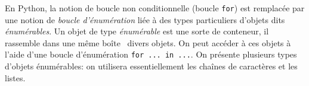 
    
En Python, la notion de boucle non conditionnelle (boucle \texttt{for}) est remplacée par une notion de \emph{boucle d'énumération} liée à des types particuliers d'objets dits \emph{énumérables}.\newline
Un objet de type \emph{énumérable} est une sorte de conteneur, il rassemble \og dans une même boîte\fg~ divers objets. On peut accéder à ces objets à l'aide d'une boucle d'énumération \texttt{for ... in ...}.\newline
On présente plusieurs types d'objets énumérables: on utilisera essentiellement les chaînes de caractères et les listes.

